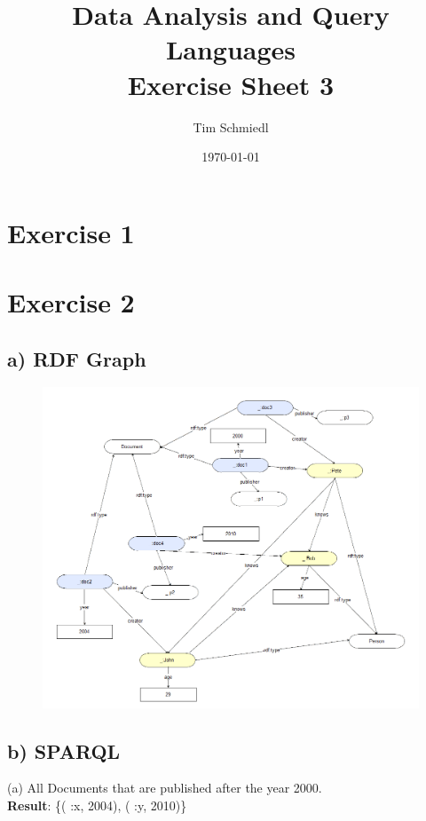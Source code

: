 \documentclass{article}
\begin{document}
\title{Data Analysis and Query Languages \\
 Exercise Sheet 3}
\date{\today}
\author{Tim Schmiedl} 
\maketitle

\section*{Exercise 1}
 


\vspace{2cm}
\section*{Exercise 2}
\subsection*{a) RDF Graph}
\begin{figure}[h!]
    \includegraphics[width=1.2\textwidth]{img/rdf-graph.png}
\end{figure}

\subsection*{b) SPARQL}
\vspace{0.3cm}
(a) All Documents that are published after the year 2000.\\
\textbf{Result}: \{( :x, 2004), ( :y, 2010)\}\\
\vspace{0.3cm}
\end{document}
